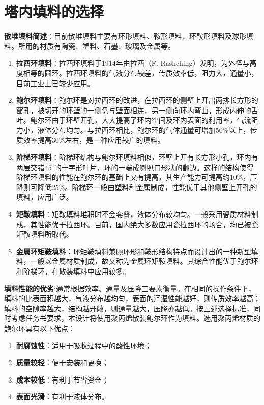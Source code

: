 \section{塔内填料的选择}

\textbf{散堆填料简述}：目前散堆填料主要有环形填料、鞍形填料、环鞍形填料及球形填料。所用的材质有陶瓷、塑料、石墨、玻璃及金属等。

\begin{enumerate}
	\item \textbf{拉西环填料}：拉西环填料于1914年由拉西（F. Rashching）发明，为外径与高度相等的圆环。拉西环填料的气液分布较差，传质效率低，阻力大，通量小，目前工业上已较少应用。
	
	\item \textbf{鲍尔环填料}：鲍尔环是对拉西环的改进，在拉西环的侧壁上开出两排长方形的窗孔，被切开的环壁的一侧仍与壁面相连，另一侧向环内弯曲，形成内伸的舌叶。鲍尔环由于环壁开孔，大大提高了环内空间及环内表面的利用率，气流阻力小，液体分布均匀。与拉西环相比，鲍尔环的气体通量可增加$50\%$以上，传质效率提高$30\%$左右，是一种应用较广的填料。
	
	\item \textbf{阶梯环填料}：阶梯环结构与鲍尔环填料相似，环壁上开有长方形小孔，环内有两层交错$45^{\circ}$的十字形叶片，环的一端成喇叭口形状的翻边。这样的结构使得阶梯环填料的性能在鲍尔环的基础上又有提高，其生产能力可提高约$10\%$，压降则可降低$25\%$。阶梯环一般由塑料和金属制成，性能优于其他侧壁上开孔的填料，应用广泛。
	\item \textbf{矩鞍填料}：矩鞍填料堆积时不会套叠，液体分布较均匀。一般采用瓷质材料制成，其性能优于拉西环。目前，国内绝大多数应用瓷拉西环的场合，均已被瓷矩鞍填料所取代。
	
	\item \textbf{金属环矩鞍填料}：环矩鞍填料兼顾环形和鞍形结构特点而设计出的一种新型填料，一般以金属材质制成，故又称为金属环矩鞍填料。其综合性能优于鲍尔环和阶梯环，在散装填料中应用较多。
\end{enumerate}

\textbf{填料性能的优劣}:通常根据效率、通量及压降三要素衡量。在相同的操作条件下，填料的比表面积越大，气液分布越均匀，表面的润湿性能越好，则传质效率越高；填料的空隙率越大，结构越开敞，则通量越大，压降亦越低。按上述选择标准，同时考虑任务书要求，本设计将使用聚丙烯散装鲍尔环作为填料。选用聚丙烯材质的鲍尔环具有以下优点：
\begin{enumerate}
	\item \textbf{耐腐蚀性}：适用于吸收过程中的酸性环境；
	
	\item \textbf{质量较轻}：便于安装和更换；
	
	\item \textbf{成本较低}：有利于节省资金；
	
	\item \textbf{表面光滑}：有利于液体分布。
\end{enumerate}

